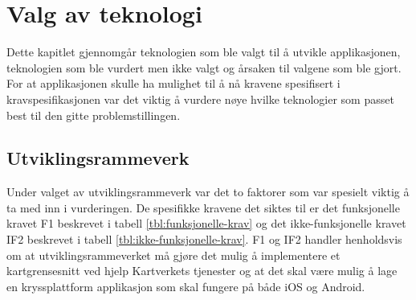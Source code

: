 \chapter{Valg av teknologi}
Dette kapitlet gjennomgår teknologien som ble valgt til å utvikle applikasjonen, teknologien som ble vurdert men ikke valgt og årsaken til valgene som ble gjort. For at applikasjonen skulle ha mulighet til å nå kravene spesifisert i kravspesifikasjonen var det viktig å vurdere nøye hvilke teknologier som passet best til den gitte problemstillingen.

\section{Utviklingsrammeverk}
Under valget av utviklingsrammeverk var det to faktorer som var spesielt viktig å ta med inn i vurderingen. De spesifikke kravene det siktes til er det funksjonelle kravet F1 beskrevet i tabell \ref{tbl:funksjonelle-krav} og det ikke-funksjonelle kravet IF2 beskrevet i tabell \ref{tbl:ikke-funksjonelle-krav}. F1 og IF2 handler henholdsvis om at utviklingsrammeverket må gjøre det mulig å implementere et kartgrensesnitt ved hjelp Kartverkets tjenester og at det skal være mulig å lage en kryssplattform applikasjon som skal fungere på både iOS og Android.

